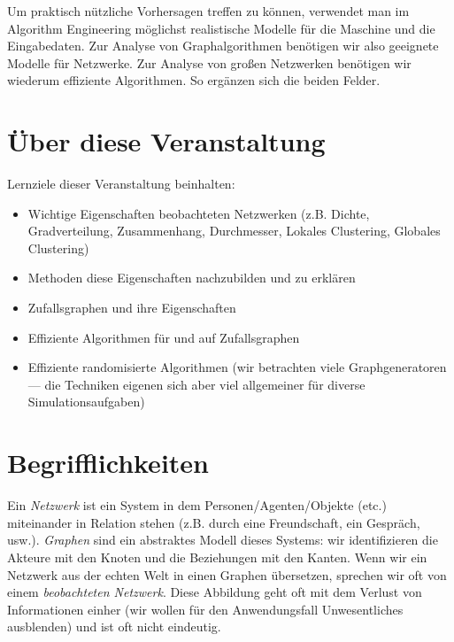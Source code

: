 Um praktisch nützliche Vorhersagen treffen zu können, verwendet man im Algorithm Engineering möglichst realistische Modelle für die Maschine und die Eingabedaten.
Zur Analyse von Graphalgorithmen benötigen wir also geeignete Modelle für Netzwerke.
Zur Analyse von großen Netzwerken benötigen wir wiederum effiziente Algorithmen.
So ergänzen sich die beiden Felder.

\section{Über diese Veranstaltung}
Lernziele dieser Veranstaltung beinhalten:
\begin{itemize}
    \item Wichtige Eigenschaften beobachteten Netzwerken (z.B. Dichte, Gradverteilung, Zusammenhang, Durchmesser, Lokales Clustering, Globales Clustering)
    \item Methoden diese Eigenschaften nachzubilden und zu erklären
    \item Zufallsgraphen und ihre Eigenschaften
    \item Effiziente Algorithmen für und auf Zufallsgraphen
    \item Effiziente randomisierte Algorithmen (wir betrachten viele Graphgeneratoren --- die Techniken eigenen sich aber viel allgemeiner für diverse Simulationsaufgaben)
\end{itemize}

\section{Begrifflichkeiten}
Ein \emph{Netzwerk} ist ein System in dem Personen/Agenten/Objekte (etc.) miteinander in Relation stehen (z.B. durch eine Freundschaft, ein Gespräch, usw.).
\emph{Graphen} sind ein abstraktes Modell dieses Systems: wir identifizieren die Akteure mit den Knoten und die Beziehungen mit den Kanten.
Wenn wir ein Netzwerk aus der echten Welt in einen Graphen übersetzen, sprechen wir oft von einem \emph{beobachteten Netzwerk}.
Diese Abbildung geht oft mit dem Verlust von Informationen einher (wir wollen für den Anwendungsfall Unwesentliches ausblenden) und ist oft nicht eindeutig.

